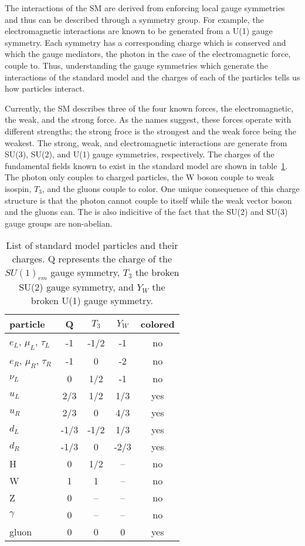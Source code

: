 The interactions of the SM are derived from enforcing local gauge 
symmetries and
thus can be described through a symmetry group.  For example, the 
electromagnetic interactions are known to be generated from a U(1) 
gauge symmetry.  Each symmetry has a corresponding charge which is
conserved and which the gauge mediators, the photon in the case of the
electromagnetic force, couple to.  Thus, understanding the gauge symmetries
which generate the interactions of the standard model and the charges of
each of the particles tells us how particles interact.

Currently, the SM describes three of the four known forces, the
electromagnetic, the weak, and the strong force.  As the names 
suggest, these forces operate with different strengths; the 
strong froce is the strongest and the weak force being the weakest. 
The strong, weak, and electromagnetic interactions are generate from
SU(3), SU(2), and U(1) gauge symmetries, respectively.  The charges of the fundamental
fields known to exist in the standard model are shown in 
table~\ref{table:SMcharges}.  The photon only couples to charged
particles, the W boson couple to weak isospin, $T_3$, and the 
gluons couple to color.  One unique consequence of this charge 
structure is that the photon cannot couple to itself while the 
weak vector boson and the gluons can.  The is also indicitive of
the fact that the SU(2) and SU(3) gauge groups are non-abelian. 

\begin{table}
\begin{center}
\begin{tabular}{l|c|c|c|c}
\hline 
\hline
particle & Q  & $T_3$ & $Y_W$ & colored \\ \hline \hline
$e_L$, $\mu_L$, $\tau_L$  & -1 & -1/2   &  -1 &  no \\ 
$e_R$, $\mu_R$, $\tau_R$  & -1 & 0      &  -2 &  no \\ 
$\nu_L$  & 0   & 1/2 & -1 & no \\ 
$u_L$    & 2/3 & 1/2  & 1/3& yes \\ 
$u_R$    & 2/3 & 0  & 4/3& yes \\ 
$d_L$    & -1/3& -1/2 & 1/3& yes \\ 
$d_R$    & -1/3& 0 & -2/3& yes \\
H        & 0   & 1/2  & -- & no \\
W        & 1   & 1    & -- & no \\
Z        & 0   & --   & -- & no \\
$\gamma$ & 0   & --   & -- & no \\
gluon    & 0   & 0    & 0  & yes \\
\hline
\end{tabular}
\end{center}
\label{table:SMcharges}
\caption{List of standard model particles and their charges. 
Q represents the charge of the $SU(1)_{em}$ gauge symmetry,
$T_3$ the broken SU(2) gauge symmetry, and $Y_W$ the broken 
U(1) gauge symmetry.}
\end{table}

